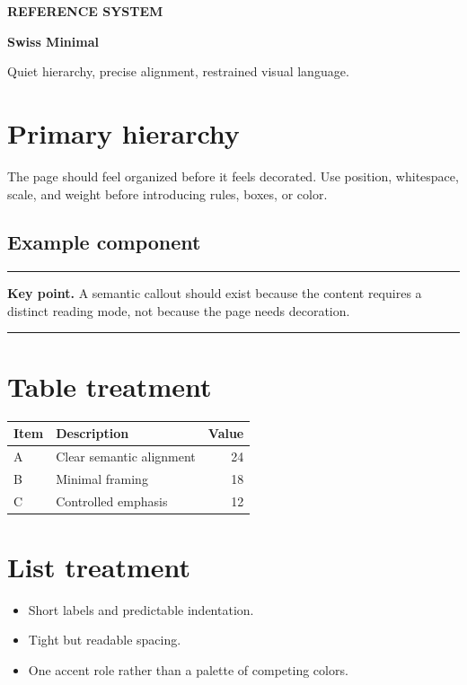 \documentclass[11pt,a4paper]{scrartcl}
\newcommand{\eyebrow}[1]{%
  {\small\sffamily\bfseries\color{Muted}\MakeUppercase{#1}\par}%
  \vspace{0.35\baselineskip}%
}
\newenvironment{keypoint}
  {\par\medskip\noindent\begin{minipage}{\linewidth}\small
   \color{Muted}\rule{\linewidth}{0.4pt}\par\medskip}
  {\medskip\par\color{Muted}\rule{\linewidth}{0.4pt}\end{minipage}\par\medskip}
\begin{document}
\eyebrow{Reference system}
{\Huge\bfseries Swiss Minimal\par}
\vspace{0.6\baselineskip}
{\large\color{Muted}Quiet hierarchy, precise alignment, restrained visual language.\par}

\vspace{2\baselineskip}

\section{Primary hierarchy}
The page should feel organized before it feels decorated. Use position, whitespace,
scale, and weight before introducing rules, boxes, or color.

\subsection{Example component}
\begin{keypoint}
\textbf{Key point.} A semantic callout should exist because the content requires a distinct
reading mode, not because the page needs decoration.
\end{keypoint}

\section{Table treatment}
\begin{tabularx}{\linewidth}{@{}lXr@{}}
\toprule
Item & Description & Value \\
\midrule
A & Clear semantic alignment & 24 \\
B & Minimal framing & 18 \\
C & Controlled emphasis & 12 \\
\bottomrule
\end{tabularx}

\section{List treatment}
\begin{itemize}
  \item Short labels and predictable indentation.
  \item Tight but readable spacing.
  \item One accent role rather than a palette of competing colors.
\end{itemize}
\end{document}
